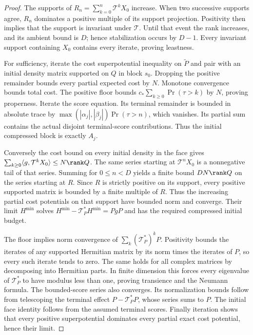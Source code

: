\begin{proof}
The supports of $R_n=\sum_{k=0}^n\mathcal T^kX_0$ increase. When two successive supports agree, $R_n$ dominates a positive multiple of its support projection. Positivity then implies that the support is invariant under $\mathcal T$. Until that event the rank increases, and its ambient bound is $D$; hence stabilization occurs by $D-1$. Every invariant support containing $X_0$ contains every iterate, proving leastness.

For sufficiency, iterate the cost superpotential inequality on $\widetilde P$ and pair with an initial density matrix supported on $Q$ in block $s_0$. Dropping the positive remainder bounds every partial expected cost by $N$. Monotone convergence bounds total cost. The positive floor bounds $c_*\sum_{k\ge0}\Pr(\tau>k)$ by $N$, proving properness. Iterate the score equation. Its terminal remainder is bounded in absolute trace by $\max(|\alpha_j|,|\beta_j|)\Pr(\tau>n)$, which vanishes. Its partial sum contains the actual disjoint terminal-score contributions. Thus the initial compressed block is exactly $A_j$.

Conversely the cost bound on every initial density in the face gives
$\sum_{k\ge0}\langle g,\mathcal T^kX_0\rangle\le N\rank Q$.
The same series starting at $\mathcal T^nX_0$ is a nonnegative tail of that series. Summing for $0\le n<D$ yields a finite bound $DN\rank Q$ on the series starting at $R$. Since $R$ is strictly positive on its support, every positive supported matrix is bounded by a finite multiple of $R$. Thus the increasing partial cost potentials on that support have bounded norm and converge. Their limit $H^{\min}$ solves $H^{\min}-\mathcal T_P^*H^{\min}=PgP$ and has the required compressed initial budget.

The floor implies norm convergence of $\sum_k(\mathcal T_P^*)^kP$. Positivity bounds the iterates of any supported Hermitian matrix by its norm times the iterates of $P$, so every such iterate tends to zero. The same holds for all complex matrices by decomposing into Hermitian parts. In finite dimension this forces every eigenvalue of $\mathcal T_P^*$ to have modulus less than one, proving transience and the Neumann formula. The bounded-score series also converges. Its normalization bounds follow from telescoping the terminal effect $P-\mathcal T_P^*P$, whose series sums to $P$. The initial face identity follows from the assumed terminal scores. Finally iteration shows that every positive superpotential dominates every partial exact cost potential, hence their limit.
\end{proof}

